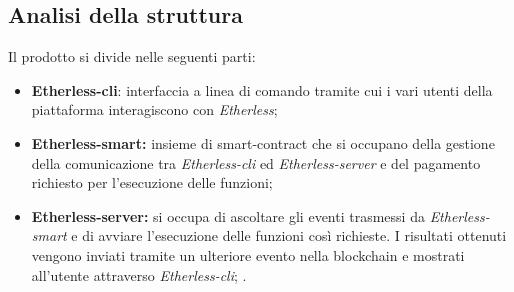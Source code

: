 \subsection{Analisi della struttura}
Il prodotto si divide nelle seguenti parti: 
\begin{itemize}
	\item \textbf{Etherless-cli}: interfaccia a linea di comando tramite cui i vari utenti della piattaforma interagiscono con \textit{Etherless}; 
	\item \textbf{Etherless-smart:} insieme di smart-contract che si occupano della gestione della comunicazione tra \textit{Etherless-cli} ed \textit{Etherless-server} e del pagamento richiesto per l'esecuzione delle funzioni; 
	\item \textbf{Etherless-server:} si occupa di ascoltare gli eventi trasmessi da \textit{Etherless-smart} e di avviare l'esecuzione delle funzioni così richieste. I risultati ottenuti vengono inviati tramite un ulteriore evento nella blockchain e mostrati all'utente attraverso \textit{Etherless-cli}; .
\end{itemize}

